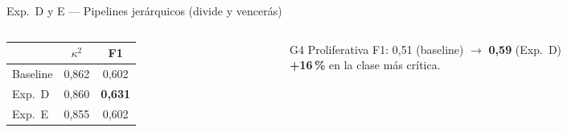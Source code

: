 \documentclass[aspectratio=169, 11pt]{beamer}
\begin{document}
\begin{frame}{Exp.~D y E --- Pipelines jerárquicos (divide y vencerás)}
\begin{columns}[T]
\begin{column}{0.50\textwidth}
    \end{column}
  \end{columns}

  \vspace{12pt}
  \begin{columns}[T]
    \begin{column}{0.46\textwidth}
      \centering
      \scriptsize
      \begin{tabular}{lcc}
        \toprule
        & $\kappa^2$ & F1 \\
        \midrule
        Baseline & 0,862 & 0,602 \\
        Exp.~D   & 0,860 & \textbf{0,631} \\
        Exp.~E   & 0,855 & 0,602 \\
        \bottomrule
      \end{tabular}
    \end{column}
    \begin{column}{0.48\textwidth}
      \begin{block}{G4 Proliferativa}
        F1: 0,51 (baseline) $\to$ \textbf{0,59} (Exp.~D)\\
        \textbf{+16\,\%} en la clase más crítica.
      \end{block}
    \end{column}
  \end{columns}
\end{frame}
\end{document}
